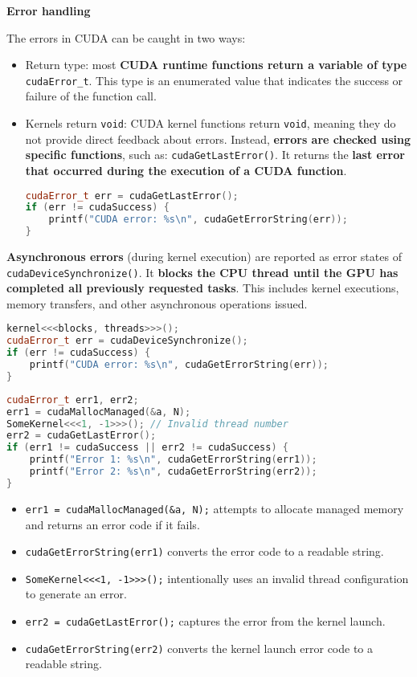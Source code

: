 \highspace
\begin{flushleft}
    \textcolor{Green3}{ \textbf{Error handling}}
\end{flushleft}
The errors in CUDA can be caught in two ways:
\begin{itemize}
    \item Return type: most \textbf{CUDA runtime functions return a variable of type} \texttt{cudaError\_t}. This type is an enumerated value that indicates the success or failure of the function call.
    
    \item Kernels return \texttt{void}: CUDA kernel functions return \texttt{void}, meaning they do not provide direct feedback about errors. Instead, \textbf{errors are checked using specific functions}, such as: \texttt{cudaGetLastError()}. It returns the \textbf{last error that occurred during the execution of a CUDA function}.
    \begin{lstlisting}[language=C++]
cudaError_t err = cudaGetLastError();
if (err != cudaSuccess) {
    printf("CUDA error: %s\n", cudaGetErrorString(err));
}
    \end{lstlisting}
\end{itemize}
\textbf{Asynchronous errors} (during kernel execution) are reported as error states of \texttt{cudaDeviceSynchronize()}. It \textbf{blocks the CPU thread until the GPU has completed all previously requested tasks}. This includes kernel executions, memory transfers, and other asynchronous operations issued.
\begin{lstlisting}[language=C++]
kernel<<<blocks, threads>>>();
cudaError_t err = cudaDeviceSynchronize();
if (err != cudaSuccess) {
    printf("CUDA error: %s\n", cudaGetErrorString(err));
}
\end{lstlisting}
\begin{examplebox}
    \begin{lstlisting}[language=C++]
cudaError_t err1, err2;
err1 = cudaMallocManaged(&a, N);
SomeKernel<<<1, -1>>>(); // Invalid thread number
err2 = cudaGetLastError();
if (err1 != cudaSuccess || err2 != cudaSuccess) {
    printf("Error 1: %s\n", cudaGetErrorString(err1));
    printf("Error 2: %s\n", cudaGetErrorString(err2));
}\end{lstlisting}
    \begin{itemize}
        \item \texttt{err1 = cudaMallocManaged(\&a, N);} attempts to allocate managed memory and returns an error code if it fails.
        \item \texttt{cudaGetErrorString(err1)} converts the error code to a readable string.
        \item \texttt{SomeKernel<<<1, -1>>>();} intentionally uses an invalid thread configuration to generate an error.
        \item \texttt{err2 = cudaGetLastError();} captures the error from the kernel launch.
        \item \texttt{cudaGetErrorString(err2)} converts the kernel launch error code to a readable string.
    \end{itemize}
\end{examplebox}